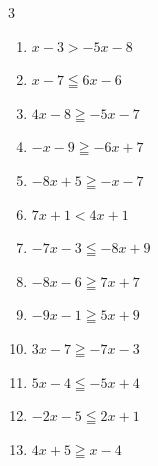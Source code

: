 \begin{multicols}{3}
\begin{enumerate}
  \item $x-3>-5x-8$


  \item $x-7\leqq 6x-6$


  \item $4x-8\geqq -5x-7$


  \item $-x-9\geqq -6x+7$


  \item $-8x+5\geqq -x-7$


  \item $7x+1<4x+1$

        \phantom{$\displaystyle x<0$}

  \item $-7x-3\leqq -8x+9$

        \phantom{$\displaystyle x\leqq 12$}

  \item $-8x-6\geqq 7x+7$


  \item $-9x-1\geqq 5x+9$


  \item $3x-7\geqq -7x-3$


  \item $5x-4\leqq -5x+4$


  \item $-2x-5\leqq 2x+1$


\columnbreak %

  \item $4x+5\geqq x-4$

        \phantom{$\displaystyle x\geqq -3$}


\end{enumerate}
\end{multicols}
